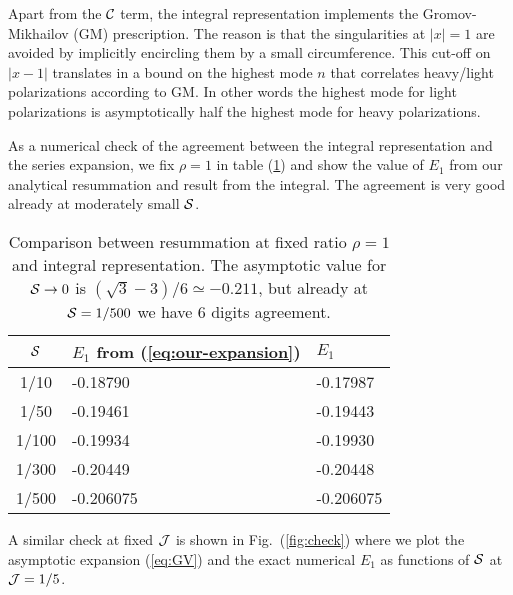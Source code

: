 Apart from the $\mathcal C$ term, the integral representation implements the Gromov-Mikhailov (GM) prescription. The reason is that the singularities at $|x|=1$ are avoided by implicitly encircling them by a small circumference. This cut-off on $|x-1|$ translates in a bound on the highest mode $n$ that correlates heavy/light polarizations according to GM. In other words the highest mode for light polarizations is asymptotically half the highest mode for heavy polarizations. 

As a numerical check of the agreement between the integral representation and the series expansion, 
we fix $\rho=1$ in table (\ref{tab:check1})  and show
the value of $E_{1}$ from our analytical resummation and result from the integral. The agreement is very good already 
at moderately small $\mathcal S$.

\begin{table}[htb]
\begin{center}
\begin{tabular}{c|ll}
$\mathcal S$ & $E_{1}$ from (\ref{eq:our-expansion}) & $E_{1}$ \\
\hline
1/10 & -0.18790 & -0.17987  \\
1/50 & -0.19461 & -0.19443 \\
1/100 & -0.19934 & -0.19930 \\
1/300 & -0.20449 & -0.20448 \\
1/500 & -0.206075 & -0.206075
\end{tabular}
\caption{Comparison between resummation at fixed ratio
$\rho=1$ and integral representation. The asymptotic value for $\mathcal S\to 0$ is $(\sqrt 3-3)/6\simeq -0.211$, but already at $\mathcal S = 1/500$ we have 6 digits agreement.
}
\label{tab:check1}
\end{center}
\end{table}

\noindent
A similar check at fixed $\mathcal J$ is shown in Fig.~(\ref{fig:check}) where we plot the asymptotic expansion (\ref{eq:GV}) and the exact numerical $E_{1}$ as functions of $\mathcal S$ at $\mathcal J=1/5$.


